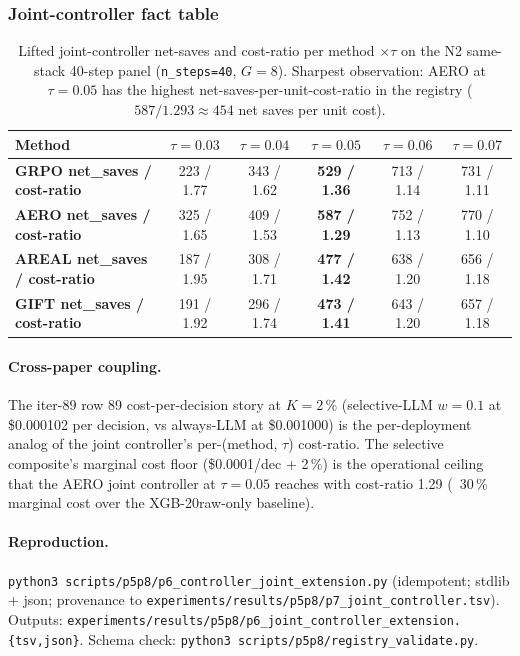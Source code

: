 \subsubsection{Joint-controller fact table}\label{sec:p6-joint-controller-extension-table}

\begin{table}[t]
\centering\small
\caption{Lifted joint-controller net-saves and cost-ratio per
method $\times \tau$ on the N2 same-stack 40-step panel
(\texttt{n\_steps=40}, $G{=}8$). Sharpest observation: AERO at $\tau{=}0.05$
has the highest net-saves-per-unit-cost-ratio in the registry
($587 / 1.293 \approx 454$ net saves per unit cost).}
\label{tab:p6-joint-controller-extension}
\begin{tabular}{lccccc}
\toprule
Method & $\tau{=}0.03$ & $\tau{=}0.04$ & $\tau{=}0.05$ & $\tau{=}0.06$ & $\tau{=}0.07$ \\
\midrule
\textbf{GRPO net\_saves / cost-ratio} & 223 / 1.77 & 343 / 1.62 & \textbf{529 / 1.36} & 713 / 1.14 & 731 / 1.11 \\
\textbf{AERO net\_saves / cost-ratio} & 325 / 1.65 & 409 / 1.53 & \textbf{587 / 1.29} & 752 / 1.13 & 770 / 1.10 \\
\textbf{AREAL net\_saves / cost-ratio} & 187 / 1.95 & 308 / 1.71 & \textbf{477 / 1.42} & 638 / 1.20 & 656 / 1.18 \\
\textbf{GIFT net\_saves / cost-ratio} & 191 / 1.92 & 296 / 1.74 & \textbf{473 / 1.41} & 643 / 1.20 & 657 / 1.18 \\
\bottomrule
\end{tabular}
\end{table}

\paragraph{Cross-paper coupling.} The iter-89 row 89 cost-per-decision
story at $K{=}2\,\%$ (selective-LLM $w{=}0.1$ at \$0.000102 per
decision, vs always-LLM at \$0.001000) is the per-deployment analog
of the joint controller's per-(method, $\tau$) cost-ratio. The selective
composite's marginal cost floor (\$0.0001/dec + 2\,\%) is the
operational ceiling that the AERO joint controller at
$\tau{=}0.05$ reaches with cost-ratio 1.29 (~30\,\% marginal cost
over the XGB-20raw-only baseline).

\paragraph{Reproduction.}
\texttt{python3 scripts/p5p8/p6\_controller\_joint\_extension.py}
(idempotent; stdlib + json; provenance to
\texttt{experiments/results/p5p8/p7\_joint\_controller.tsv}).
Outputs: \texttt{experiments/results/p5p8/p6\_joint\_controller\_extension.\{tsv,json\}}.
Schema check: \texttt{python3 scripts/p5p8/registry\_validate.py}.
